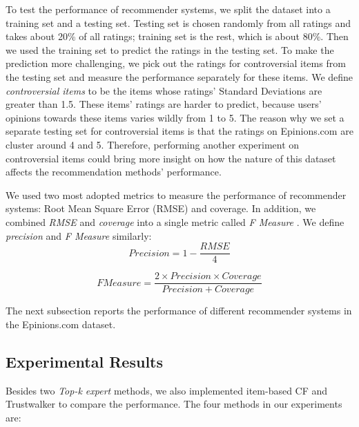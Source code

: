 \documentclass[12pt]{article}
\begin{document}
To test the performance of recommender systems, we split the dataset into a training set and a testing set. Testing set is chosen randomly from all ratings and takes about 20\% of all ratings; training set is the rest, which is about 80\%. Then we used the training set to predict the ratings in the testing set. To make the prediction more challenging, we pick out the ratings for controversial items from the testing set and measure the performance separately for these items. We define \emph{controversial items} to be the items whose ratings' Standard Deviations are greater than 1.5. These items' ratings are harder to predict, because users' opinions towards these items varies wildly from 1 to 5. The reason why we set a separate testing set for controversial items is that the ratings on Epinions.com are cluster around 4 and 5. Therefore, performing another experiment on controversial items could bring more insight on how the nature of this dataset affects the recommendation methods' performance. 

We used two most adopted metrics to measure the performance of recommender systems: Root Mean Square Error (RMSE) and coverage. In addition, we combined \emph{RMSE} and \emph{coverage} into a single metric called \emph{F Measure} \cite{Jamali:2009p67}. We define \emph{precision} and \emph{F Measure} similarly:
\begin{equation}
Precision = 1 - \frac{RMSE}{4}
\end{equation}

\begin{equation}
F Measure = \frac{2 \times Precision \times Coverage}{Precision + Coverage}
\end{equation}

The next subsection reports the performance of different recommender systems in the Epinions.com dataset. 

\subsection{Experimental Results}
Besides two \emph{Top-k expert} methods, we also implemented item-based CF and Trustwalker to compare the performance. The four methods in our experiments are:
\end{document}
